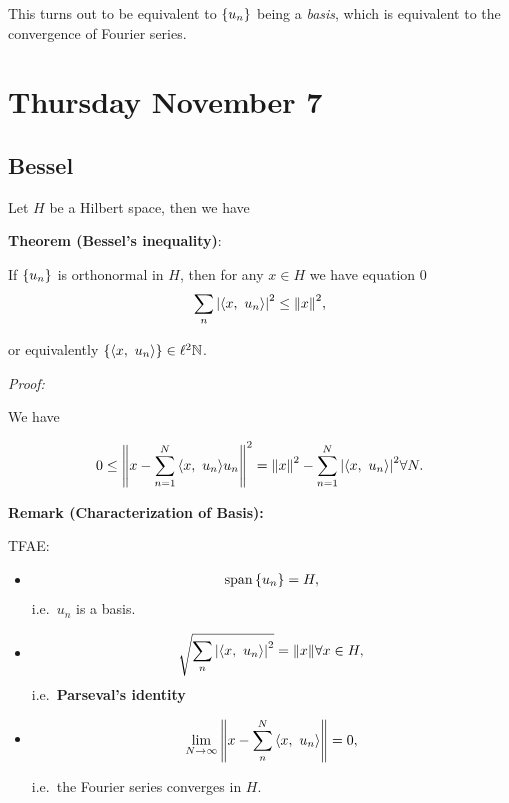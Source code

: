 This turns out to be equivalent to \(\left\{{u_n}\right\}\) being a
\emph{basis}, which is equivalent to the convergence of Fourier series.

\hypertarget{thursday-november-7}{%
\section{Thursday November 7}\label{thursday-november-7}}

\hypertarget{bessel}{%
\subsection{Bessel}\label{bessel}}

Let \(H\) be a Hilbert space, then we have

\textbf{Theorem (Bessel's inequality)}:

If \(\left\{{u_n}\right\}\) is orthonormal in \(H\), then for any \(x \in H\) we
have equation 0
\begin{align*}
\sum_n {\left\lvert {{\left\langle {x},~{u_n} \right\rangle}} \right\rvert}^2 \leq {\left\lVert {x} \right\rVert}^2,
\end{align*}

or equivalently \(\left\{{ {\left\langle {x},~{u_n} \right\rangle} }\right\} \in \ell^2 {\mathbb{N}}\).

\emph{Proof:}

We have

\begin{equation}
0 \leq {\left\lVert {
x - \sum_{n=1}^N {\left\langle {x},~{u_n} \right\rangle} u_n
} \right\rVert}^2 =
{\left\lVert {x} \right\rVert}^2 - \sum_{n=1}^N {\left\lvert {
{\left\langle {x},~{u_n} \right\rangle}
} \right\rvert}^2 \forall N
.\end{equation}

\textbf{Remark (Characterization of Basis):}

TFAE:

\begin{itemize}
\item

  \begin{align*}\mathrm{span} \left\{{u_n}\right\} = H,\end{align*} i.e.~\(u_n\)
  is a basis.
\item

  \begin{align*}\sqrt{ \sum_n {\left\lvert { {\left\langle {x},~{u_n} \right\rangle}  } \right\rvert}^2  } = {\left\lVert {x} \right\rVert} \forall x\in H,\end{align*}
  i.e.~\textbf{Parseval's identity}
\item

  \begin{align*}\lim_{N\to\infty} {\left\lVert { x - \sum_n^N {\left\langle {x},~{u_n} \right\rangle}  } \right\rVert} = 0,\end{align*}

  i.e.~the Fourier series converges in \(H\).
\end{itemize}

